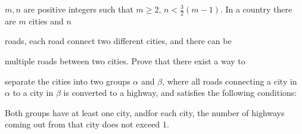 $m,n$ are positive integers such that $m\ge 2$, $n < \frac{3}{2}(m-1)$. In a country there are $m$ cities and $n$

 roads, each road connect two different cities, and there can be 

multiple roads between two cities. Prove that there exist a way to 

separate the cities into two groups $\alpha$ and $\beta$, where all roads connecting a city in $\alpha$ to a city in $\beta$ is converted to a highway, and satisfies the following conditions:

Both groups have at least one city, andfor each city, the number of highways coming out from that city does not exceed $1$.
